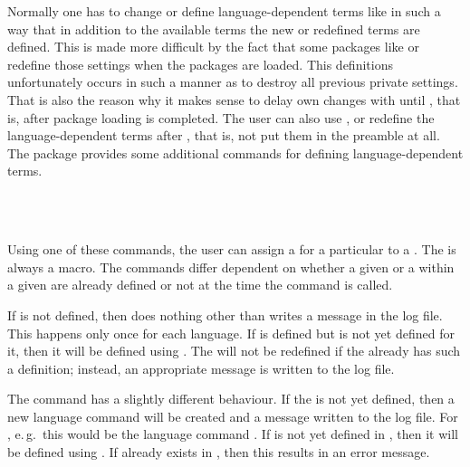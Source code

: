 Normally one has to change or define language-dependent terms like
 in such a way that in addition to the available terms
the new or redefined terms are defined. This is made more difficult by the
fact that some packages like  or
 redefine those settings when the
packages are loaded. This definitions unfortunately occurs in such a manner as
to destroy all previous private settings. That is also the reason why it makes
sense to delay own changes with  until
, that is, after package loading is
completed. The user can also use , or redefine the
language-dependent terms after , that is,
not put them in the preamble at all. The package 
provides some additional commands for defining language-dependent terms.


\begin{Declaration}
    \\
    \\
\end{Declaration}
%
%
%
Using one of these commands, the user can assign a  for a
particular  to a .  The  is always a
macro. The commands differ dependent on whether a given  or a
 within a given  are already defined or not at the
time the command is called.

If  is not defined, then  does
nothing other than writes a message in the log file. This happens only once
for each language.  If  is defined but  is not yet
defined for it, then it will be defined using .  The
 will not be redefined if the  already has such a
definition; instead, an appropriate message is written to the log file.

The command  has a slightly different behaviour.  If the
 is not yet defined, then a new language command will be
created and a message written to the log file. For 
, e.\,g.\, this would be the language command
. If  is not yet defined in
, then it will be defined using .  If
 already exists in , then this results in an error
message.

